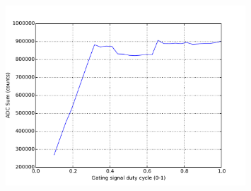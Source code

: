 \documentclass[a4paper, 11pt]{article}%
\begin{document}
%


\begin{figure}[htbp]%
\centering%
\includegraphics[width=0.8\textwidth]{./Results/scaled_DC_vs_ADC_Sum.pdf}%
\caption{}%
\end{figure}

%
\end{document}

